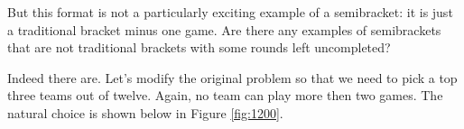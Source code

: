 {    

    But this format is not a particularly exciting example of a semibracket: it is just a traditional bracket minus one game. Are there any examples of semibrackets that are not traditional brackets with some rounds left uncompleted?

    Indeed there are. Let's modify the original problem so that we need to pick a top three teams out of twelve. Again, no team can play more then two games. The natural choice is shown below in Figure \ref{fig:1200}.
    





















}
